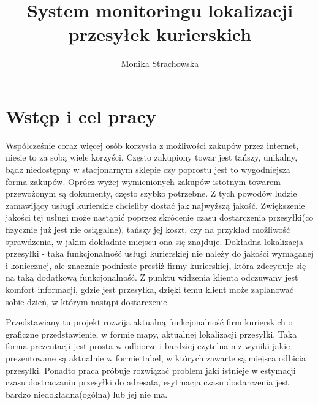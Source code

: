 \documentclass[eng,printmode,oneside]{mgr}
\title{System monitoringu lokalizacji przesyłek kurierskich}
\author{Monika Strachowska}
\begin{document}


\maketitle %


\tableofcontents %

\chapter{Wstęp i cel pracy}

Współcześnie coraz więcej osób korzysta z możliwości zakupów przez internet,
niesie to za sobą wiele korzyści. Często zakupiony towar jest tańszy, unikalny,
bądz niedostępny w stacjonarnym sklepie czy poprostu jest to wygodniejsza forma
zakupów. Oprócz wyżej wymienionych zakupów istotnym towarem przewożonym
są dokumenty, często szybko potrzebne. Z tych powodów ludzie zamawijący usługi 
kurierskie chcieliby dostać jak najwyższą jakość. Zwiększenie jakości tej
usługi może nastąpić poprzez skrócenie czasu dostarczenia przesyłki(co
fizycznie już jest nie osiągalne), tańszy jej koszt, czy na przykład możliwość
sprawdzenia, w jakim dokładnie miejscu ona się znajduje. Dokładna lokalizacja
przesyłki - taka funkcjonalność usługi kurierskiej nie należy do jakości
wymaganej i koniecznej, ale znacznie podniesie prestiż firmy
kurierskiej, która zdecyduje się na taką dodatkową funkcjonalność. Z punktu
widzenia klienta odczuwany jest komfort informacji, gdzie jest przesyłka, dzięki
temu klient może zaplanować sobie dzień, w którym nastąpi dostarczenie. 

Przedstawiany tu projekt rozwija aktualną funkcjonalność firm kurierskich o
graficzne przedstawienie, w formie mapy, aktualnej lokalizacji przesyłki. Taka
forma prezentacji jest prosta w odbiorze i bardziej czytelna niż wyniki
jakie prezentowane są aktualnie w formie tabel, w których zawarte są miejsca
odbicia przesyłki. Ponadto praca próbuje rozwiązać problem jaki istnieje w
estymacji czasu dostraczaniu przesyłki do adresata, esytmacja czasu
dostarczenia jest bardzo niedokładna(ogólna) lub jej nie ma.
\end{document}
